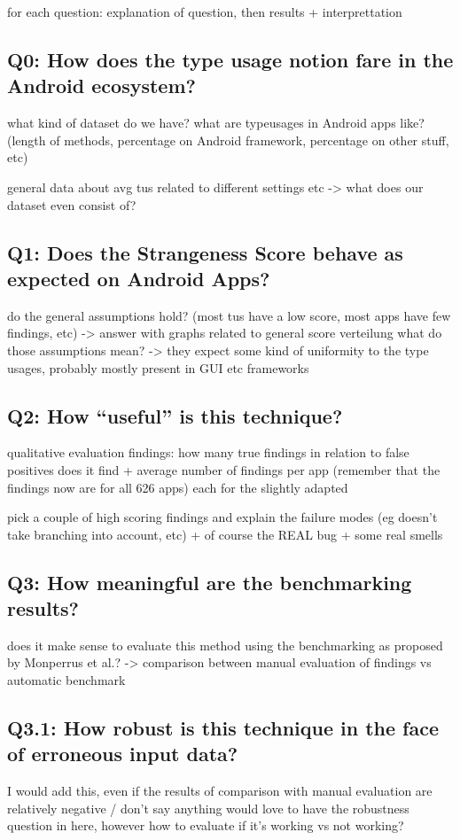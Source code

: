 for each question: explanation of question, then results + interprettation
\subsection{Q0: How does the type usage notion fare in the Android ecosystem?}
what kind of dataset do we have?
what are typeusages in Android apps like? (length of methods, percentage on Android framework, percentage on other stuff, etc)

general data about avg tus related to different settings etc -> what does our dataset even consist of?

\subsection{Q1: Does the Strangeness Score behave as expected on Android Apps?}

do the general assumptions hold? (most tus have a low score, most apps have few findings, etc)
    -> answer with graphs related to general score verteilung
    what do those assumptions mean? -> they expect some kind of uniformity to the type usages, probably mostly present in GUI etc frameworks

\subsection{Q2: How ``useful'' is this technique?}
qualitative evaluation findings:
how many true findings in relation to false positives does it find + average number of findings per app (remember that the findings now are for all 626 apps)
    each for the slightly adapted 

pick a couple of high scoring findings and explain the failure modes (eg doesn't take branching into account, etc)
+ of course the REAL bug + some real smells

\subsection{Q3: How meaningful are the benchmarking results?}
does it make sense to evaluate this method using the benchmarking as proposed by Monperrus et al.?
    -> comparison between manual evaluation of findings vs automatic benchmark

\subsection{Q3.1: How robust is this technique in the face of erroneous input data?}
I would add this, even if the results of comparison with manual evaluation are relatively negative / don't say anything
would love to have the robustness question in here, however how to evaluate if it's working vs not working?

